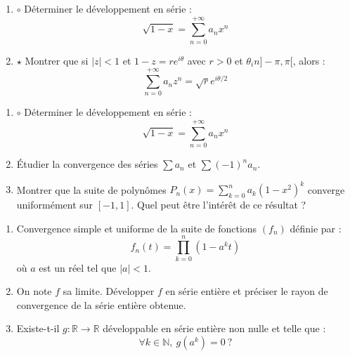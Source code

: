 \documentclass[french,a4paper]{article}
\newcommand{\N}{\mathbb{N}}
\newcommand{\R}{\mathbb{R}}
\theoremstyle{plain}
\theoremstyle{definition}
\theoremstyle{remark}
\begin{document}
\begin{ex}[Moulin.SE.44]{}
	\begin{enumerate}
		\item $\circ$ Déterminer le développement en série : $$\sqrt{1-x}=\sum_{n=0}^{+\infty}a_nx^n$$
		\item $\star$ Montrer que si $\lvert z\rvert<1$ et $1-z=re^{i\theta}$ avec $r>0$ et $\theta_in]-\pi,\pi[$, alors : $$\sum_{n=0}^{+\infty}a_nz^n=\sqrt{r}e^{i\theta/2}$$
	\end{enumerate}
\end{ex}

\begin{ex}[Moulin.SE.45]{}
	\begin{enumerate}
		\item $\circ$ Déterminer le développement en série : $$\sqrt{1-x}=\sum_{n=0}^{+\infty}a_nx^n$$
		\item Étudier la convergence des séries $\displaystyle\sum a_n$ et $\displaystyle\sum(-1)^na_n$.
		\item Montrer que la suite de polynômes $P_n(x)=\displaystyle\sum_{k=0}^{n}a_k(1-x^2)^k$ converge uniformément sur $[-1,1]$. Quel peut être l'intérêt de ce résultat ?
	\end{enumerate}
\end{ex}

\begin{ex}[Moulin.SE.46]{}
	\begin{enumerate}
		\item Convergence simple et uniforme de la suite de fonctions $(f_n)$ définie par : $$f_n(t)=\prod_{k=0}^{n}(1-a^kt)$$ où $a$ est un réel tel que $\lvert a\rvert<1$.
		\item On note $f$ sa limite. Développer $f$ en série entière et préciser le rayon de convergence de la série entière obtenue.
		\item Existe-t-il $g:\R\to\R$ développable en série entière non nulle et telle que : $$\forall k\in\N,\ g(a^k)=0\ ?$$
	\end{enumerate}
\end{ex}
\end{document}

